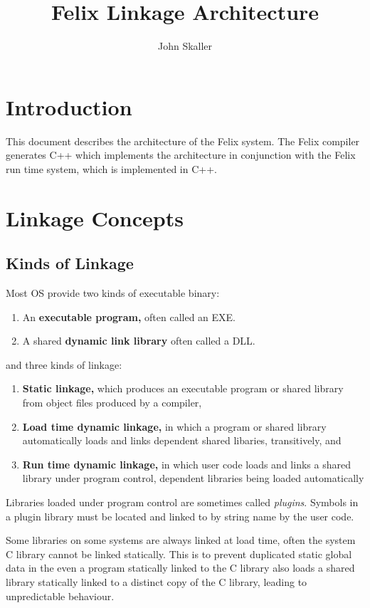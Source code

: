 \documentclass[oneside]{book}
\title{Felix Linkage Architecture}
\author{John Skaller}
\begin{document}
\maketitle
\tableofcontents
\chapter{Introduction}
This document describes the architecture of the Felix system.
The Felix compiler generates C++ which implements the architecture
in conjunction with the Felix run time system, which is implemented in C++.

\chapter{Linkage Concepts}
\section{Kinds of Linkage}
Most OS provide two kinds of executable binary: 
\begin{enumerate}
\item An \textbf{executable program,} often called an EXE.
\item A shared \textbf{dynamic link library} often called a DLL.
\end{enumerate}

and three kinds of linkage:

\begin{enumerate}
\item \textbf{Static linkage,} which produces an executable program or shared library
from object files produced by a compiler, 
\item \textbf{Load time dynamic linkage,} in which a program or shared library
automatically loads and links dependent shared libaries, transitively, and
\item \textbf{Run time dynamic linkage,} in which user code loads and links a
shared library under program control, dependent libraries being
loaded automatically
\end{enumerate}

Libraries loaded under program control are sometimes called
{\em plugins}. Symbols in a plugin library must be located and
linked to by string name by the user code.

Some libraries on some systems are always linked at
load time, often the system C library cannot be linked statically.
This is to prevent duplicated static global data in the even
a program statically linked to the C library also loads a shared
library statically linked to a distinct copy of the C library,
leading to unpredictable behaviour.
\end{document}
